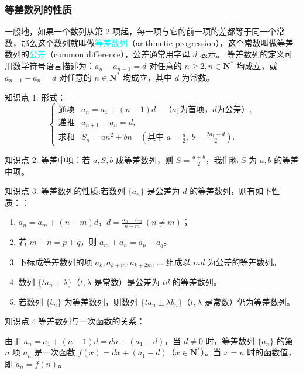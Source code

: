 \documentclass{article}
\begin{document}
\subsubsection{等差数列的性质}

一般地，如果一个数列从第 2 项起，每一项与它的前一项的差都等于同一个常数，那么这个数列就叫做\textcolor{cyan}{等差数列}（arithmetic progression），这个常数叫做等差数列的\textcolor{cyan}{公差}（common difference），公差通常用字母 \(d\) 表示。
等差数列的定义可用数学符号语言描述为：$a_n - a_{n-1} = d$ 对任意的 $n \ge 2, n \in \mathbf{N}^*$ 均成立，或 $a_{n+1} - a_n = d$ 对任意的 $n \in \mathbf{N}^*$ 均成立，其中 $d$ 为常数。
\vspace{2\baselineskip}

知识点 1. 形式：
\[
\begin{cases}
\text{通项} & a_n = a_1 + (n-1)d \quad \text{（$a_1$为首项，$d$为公差）}, \\
\text{递推} & a_{n+1} - a_n = d, \\
\text{求和} & S_n = an^2 + bn \quad \left(\text{其中 } a = \frac{d}{2},\ b = \frac{2a_1 - d}{2}\right).
\end{cases}
\]
\vspace{1\baselineskip}

知识点 2. 等差中项：若 \(a, S, b\) 成等差数列，则 \(S = \frac{a + b}{2}\)，我们称 \(S\) 为 \(a, b\) 的等差中项。
\vspace{1\baselineskip}

知识点 3. 等差数列的性质:若数列 \(\{a_n\}\) 是公差为 \(d\) 的等差数列，则有如下性质：：

\begin{enumerate}
    \item \(a_n = a_m + (n - m)d\)，\(d = \frac{a_n - a_m}{n - m}\ (n \neq m)\)；
    \item 若 \(m + n = p + q\)，则 \(a_m + a_n = a_p + a_q\)。
    \item 下标成等差数列的项 \(a_k, a_{k+m}, a_{k+2m}, \dots\) 组成以 \(md\) 为公差的等差数列。
    \item 数列 \(\{ta_n + \lambda\}\)（\(t, \lambda\) 是常数）是公差为 \(td\) 的等差数列。
    \item 若数列 \(\{b_n\}\) 为等差数列，则数列 \(\{ta_n \pm \lambda b_n\}\)（\(t, \lambda\) 是常数）仍为等差数列。
\end{enumerate}

知识点 4.等差数列与一次函数的关系：

由于 \(a_n = a_1 + (n-1)d = dn + (a_1 - d)\)，当 \(d \neq 0\) 时，等差数列 \(\{a_n\}\) 的第 \(n\) 项 \(a_n\) 是一次函数 \(f(x) = dx + (a_1 - d)\)（\(x \in \mathbf{N}^*\)）。当 \(x = n\) 时的函数值，即 \(a_n = f(n)\)。
\end{document}
